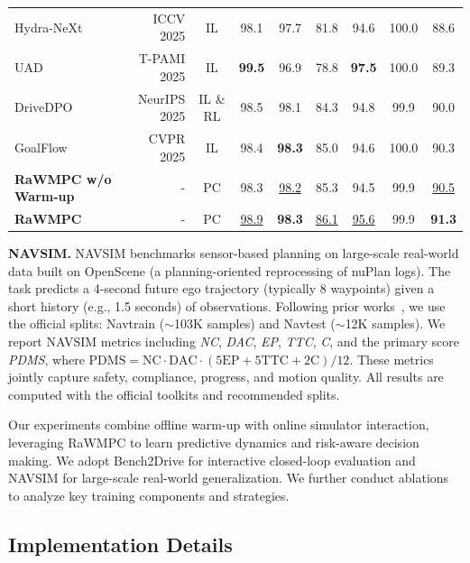 \documentclass[twocolumn]{template}
\theoremstyle{thmstyleone}%
\theoremstyle{thmstyletwo}%
\theoremstyle{thmstylethree}%
\begin{document}
\begin{table}[t]
{\begin{tabular}{lr|c|ccccc|>{\columncolor{pink!20}}c}
Hydra-NeXt~\cite{HydraNeXt} & ICCV 2025 & IL & 98.1 & 97.7 & 81.8 & 94.6 & 100.0 & 88.6 \\
UAD~\cite{UAD} & T-PAMI 2025 & IL & \textbf{99.5} & 96.9 & 78.8 & \textbf{97.5} & 100.0 & 89.3 \\
DriveDPO~\cite{Drivedpo} & NeurIPS 2025 & IL \& RL & 98.5 & 98.1 & 84.3 & 94.8 & 99.9 & 90.0 \\
GoalFlow~\cite{Goalflow} & CVPR 2025 & IL & 98.4 & \textbf{98.3} & 85.0 & 94.6 & 100.0 & 90.3 \\
\textbf{RaWMPC w/o Warm-up} & - & PC & 98.3 & \underline{98.2} & 85.3 & 94.5 & 99.9 & \underline{90.5} \\
\textbf{RaWMPC} & - & PC & \underline{98.9} & \textbf{98.3} & \underline{86.1} & \underline{95.6} & 99.9 & \textbf{91.3} \\
\bottomrule
\end{tabular}}
\label{tab:NAVSIM}
\end{table}


\noindent
\textbf{NAVSIM.}
NAVSIM benchmarks sensor-based planning on large-scale real-world data built on OpenScene (a planning-oriented reprocessing of nuPlan logs).
The task predicts a 4-second future ego trajectory (typically 8 waypoints) given a short history (e.g., 1.5 seconds) of observations.
Following prior works~\cite{Drivedpo,WoTE}, we use the official splits: Navtrain ($\sim$103K samples) and Navtest ($\sim$12K samples).
We report NAVSIM metrics including \textit{NC}, \textit{DAC}, \textit{EP}, \textit{TTC}, \textit{C}, and the primary score \textit{PDMS}, where $\mathrm{PDMS}=\mathrm{NC}\cdot\mathrm{DAC}\cdot(5\mathrm{EP}+5\mathrm{TTC}+2\mathrm{C})/12$.
These metrics jointly capture safety, compliance, progress, and motion quality.
All results are computed with the official toolkits and recommended splits.

Our experiments combine offline warm-up with online simulator interaction, leveraging RaWMPC to learn predictive dynamics and risk-aware decision making. We adopt Bench2Drive for interactive closed-loop evaluation and NAVSIM for large-scale real-world generalization.
We further conduct ablations to analyze key training components and strategies.

\subsection{Implementation Details}
\end{document}
